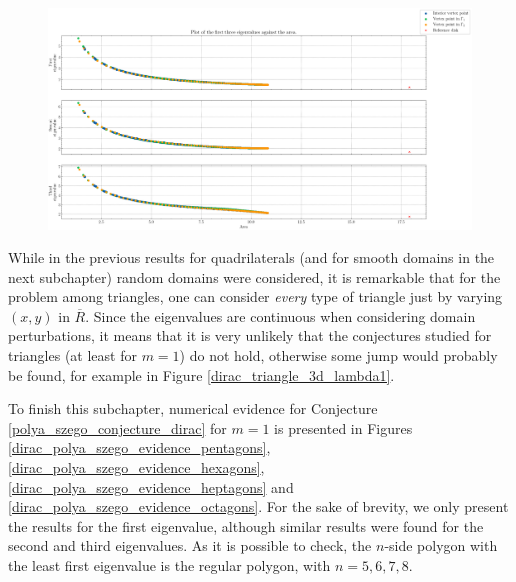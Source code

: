\begin{figure}[!htb]
    \centering
    \includegraphics[width=\linewidth]{Images/Dirac/triangles/triangle_perimeter_first_eigenvalues.png}
    \label{dirac_triangle_model_perimeter}
\end{figure}

While in the previous results for quadrilaterals (and for smooth domains in the next subchapter) random domains were considered, it is remarkable that for the problem among triangles, one can consider \textit{every} type of triangle just by varying \((x,y)\) in \(\overline{R}\). Since the eigenvalues are continuous when considering domain perturbations, it means that it is very unlikely that the conjectures studied for triangles (at least for \(m=1\)) do not hold, otherwise some jump would probably be found, for example in Figure \ref{dirac_triangle_3d_lambda1}. 

To finish this subchapter, numerical evidence for Conjecture \ref{polya_szego_conjecture_dirac} for \(m=1\) is presented in Figures \ref{dirac_polya_szego_evidence_pentagons}, \ref{dirac_polya_szego_evidence_hexagons}, \ref{dirac_polya_szego_evidence_heptagons} and \ref{dirac_polya_szego_evidence_octagons}. For the sake of brevity, we only present the results for the first eigenvalue, although similar results were found for the second and third eigenvalues. As it is possible to check, the \(n\)-side polygon with the least first eigenvalue is the regular polygon, with \(n=5,6,7,8\).

